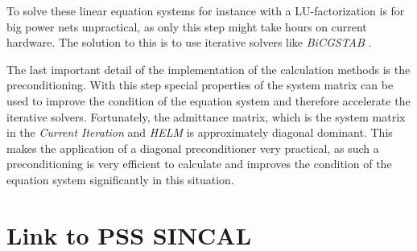 To solve these linear equation systems for instance with a LU-factorization is for big power nets unpractical, as only this step might take hours on current hardware. The solution to this is to use iterative solvers like \emph{BiCGSTAB} \cite{bicgstab}.

The last important detail of the implementation of the calculation methods is the preconditioning. With this step special properties of the system matrix can be used to improve the condition of the equation system and therefore accelerate the iterative solvers. Fortunately, the admittance matrix, which is the system matrix in the \emph{Current Iteration} and \emph{HELM} is approximately diagonal dominant. This makes the application of a diagonal preconditioner very practical, as such a preconditioning is very efficient to calculate and improves the condition of the equation system significantly in this situation.

\section{Link to PSS SINCAL}
\label{sec:link_sincal}